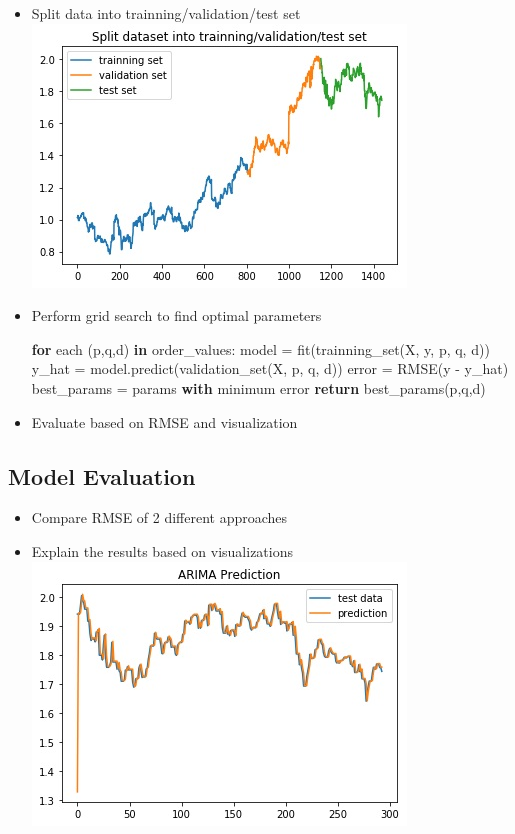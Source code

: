 \documentclass[11pt]{article}
\makeatletter
\def\maxwidth{\ifdim\Gin@nat@width>\linewidth\linewidth
    \else\Gin@nat@width\fi}
\let\Oldincludegraphics\includegraphics
\renewcommand{\includegraphics}[1]{\Oldincludegraphics[width=.8\maxwidth]{#1}}
\providecommand{\tightlist}{%
      \setlength{\itemsep}{0pt}\setlength{\parskip}{0pt}}
\newenvironment{Shaded}{}{}
\newcommand{\KeywordTok}[1]{\textcolor[rgb]{0.00,0.44,0.13}{\textbf{{#1}}}}
\newcommand{\NormalTok}[1]{{#1}}
\newcommand{\ControlFlowTok}[1]{\textcolor[rgb]{0.00,0.44,0.13}{\textbf{{#1}}}}
\newcommand{\OperatorTok}[1]{\textcolor[rgb]{0.40,0.40,0.40}{{#1}}}
\makeatother
\begin{document}
\begin{itemize}
\item
  Split data into trainning/validation/test set \\
  \includegraphics{./figures/7.jpg}
\item
  Perform grid search to find optimal parameters

\begin{Shaded}
\begin{Highlighting}[]
\ControlFlowTok{for}\NormalTok{ each (p,q,d) }\KeywordTok{in}\NormalTok{ order_values:}
\NormalTok{    model }\OperatorTok{=}\NormalTok{ fit(trainning_set(X, y, p, q, d))}
\NormalTok{    y_hat }\OperatorTok{=}\NormalTok{ model.predict(validation_set(X, p, q, d))}
\NormalTok{    error }\OperatorTok{=}\NormalTok{ RMSE(y }\OperatorTok{-}\NormalTok{ y_hat)}
\NormalTok{    best_params }\OperatorTok{=}\NormalTok{ params }\ControlFlowTok{with}\NormalTok{ minimum error}
\ControlFlowTok{return}\NormalTok{ best_params(p,q,d)}
\end{Highlighting}
\end{Shaded}
\item
  Evaluate based on RMSE and visualization
\end{itemize}

\subsection{Model Evaluation}\label{model-evaluation}

\begin{itemize}
\tightlist
\item
  Compare RMSE of 2 different approaches
\item
  Explain the results based on visualizations \\
  \includegraphics{./figures/9.jpg}
\end{itemize}
\end{document}
